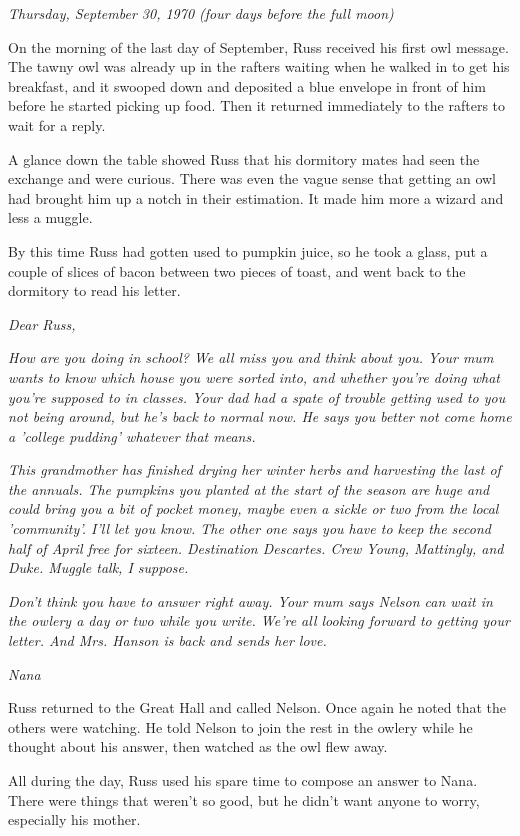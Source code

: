 \documentclass[a4paper,11pt]{article}
\begin{document}
\emph{Thursday, September 30, 1970 (four days before the full moon)}

On the morning of the last day of September, Russ received his first owl message. The tawny owl was already up in the rafters waiting when he walked in to get his breakfast, and it swooped down and deposited a blue envelope in front of him before he started picking up food. Then it returned immediately to the rafters to wait for a reply.

A glance down the table showed Russ that his dormitory mates had seen the exchange and were curious. There was even the vague sense that getting an owl had brought him up a notch in their estimation. It made him more a wizard and less a muggle.

By this time Russ had gotten used to pumpkin juice, so he took a glass, put a couple of slices of bacon between two pieces of toast, and went back to the dormitory to read his letter.

\emph{Dear Russ,}

\emph{How are you doing in school? We all miss you and think about you. Your mum wants to know which house you were sorted into, and whether you're doing what you're supposed to in classes. Your dad had a spate of trouble getting used to you not being around, but he's back to normal now. He says you better not come home a 'college pudding' whatever that means.}

\emph{This grandmother has finished drying her winter herbs and harvesting the last of the annuals. The pumpkins you planted at the start of the season are huge and could bring you a bit of pocket money, maybe even a sickle or two from the local 'community'. I'll let you know. The other one says you have to keep the second half of April free for sixteen. Destination Descartes. Crew Young, Mattingly, and Duke. Muggle talk, I suppose.}

\emph{Don't think you have to answer right away. Your mum says Nelson can wait in the owlery a day or two while you write. We're all looking forward to getting your letter. And Mrs. Hanson is back and sends her love.}

\emph{Nana}

Russ returned to the Great Hall and called Nelson. Once again he noted that the others were watching. He told Nelson to join the rest in the owlery while he thought about his answer, then watched as the owl flew away.

All during the day, Russ used his spare time to compose an answer to Nana. There were things that weren't so good, but he didn't want anyone to worry, especially his mother.
\end{document}
